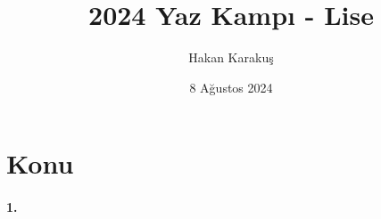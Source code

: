 \documentclass[12pt]{article}
\title{2024 Yaz Kampı - Lise}
\author{Hakan Karakuş}
\date{8 Ağustos 2024}
\begin{document}
\maketitle
\thispagestyle{empty}

\section{Konu}

\paragraph{1.} 
\end{document}
